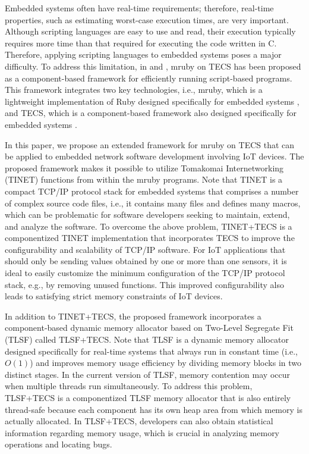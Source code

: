 \documentclass[JIP]{ipsj_v2/UTF8/ipsj}
\begin{document}
Embedded systems often have real-time requirements; therefore, real-time properties, such as estimating worst-case execution times, are very important.
Although scripting languages are easy to use and read, their execution typically requires more time than that required for executing the code written in C.
Therefore, applying scripting languages to embedded systems poses a major difficulty.
To address this limitation, in \cite{par:mrubyonTECS} and \cite{par:mrubyonTECS3}, mruby on TECS has been proposed as a component-based framework for efficiently running script-based programs.
This framework integrates two key technologies, i.e., mruby, which is a lightweight implementation of Ruby designed specifically for embedded systems \cite{par:mruby},\cite{url:mruby} and TECS, which is a component-based framework also designed specifically for embedded systems \cite{par:TECS}.

In this paper, we propose an extended framework for mruby on TECS that can be applied to embedded network software development involving IoT devices.
The proposed framework makes it possible to utilize Tomakomai Internetworking (TINET) functions from within the mruby programs.
Note that TINET is a compact TCP/IP protocol stack for embedded systems \cite{url:TINET} that comprises a number of complex source code files, i.e., it contains many files and defines many macros, which can be problematic for software developers seeking to maintain, extend, and analyze the software.
To overcome the above problem, TINET+TECS is a componentized TINET implementation that incorporates TECS to improve the configurability and scalability of TCP/IP software.
For IoT applications that should only be sending values obtained by one or more than one sensors, it is ideal to easily customize the minimum configuration of the TCP/IP protocol stack, e.g., by removing unused functions.
This improved configurability also leads to satisfying strict memory constraints of IoT devices.

In addition to TINET+TECS, the proposed framework incorporates a component-based dynamic memory allocator based on Two-Level Segregate Fit (TLSF) called TLSF+TECS.
Note that TLSF is a dynamic memory allocator designed specifically for real-time systems that always run in constant time (i.e., $O(1)$) and improves memory usage efficiency by dividing memory blocks in two distinct stages.
In the current version of TLSF, memory contention may occur when multiple threads run simultaneously.
To address this problem, TLSF+TECS is a componentized TLSF memory allocator that is also entirely thread-safe because each component has its own heap area from which memory is actually allocated.
In TLSF+TECS, developers can also obtain statistical information regarding memory usage, which is crucial in analyzing memory operations and locating bugs.
\end{document}
